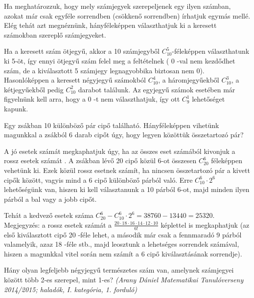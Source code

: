\begin{solution}
Ha meghatározzuk, hogy mely számjegyek szerepeljenek egy ilyen számban,
azokat már csak egyféle sorrendben (csökkenő sorrendben) írhatjuk
egymás mellé. Elég tehát azt megnéznünk, hányféleképpen választhatjuk
ki a keresett számokban szereplő számjegyeket.

Ha a keresett szám ötjegyű, akkor a 10 számjegyből $C_{10}^{5}$-féleképpen
választhatunk ki 5-öt, így ennyi ötjegyű szám felel meg a feltételnek
( 0 -val nem kezdődhet szám, de a kiválasztott 5 számjegy legnagyobbika
biztosan nem 0). Hasonlóképpen a keresett négyjegyű számokból $C_{10}^{4}$,
a háromjegyűekből $C_{10}^{3}$, a kétjegyűekből pedig $C_{10}^{2}$
darabot találunk. Az egyjegyű számok esetében már figyelnünk kell
arra, hogy a 0 -t nem választhatjuk, így ott $C_{9}^{1}$ lehetőséget
kapunk.
\end{solution}
\begin{extraproblem}
Egy zsákban 10 különböző pár cipő található. Hányféleképpen vihetünk
magunkkal a zsákból 6 darab cipőt úgy, hogy legyen közöttük összetartozó
pár? 
\end{extraproblem}

\begin{solution}
A jó esetek számát megkaphatjuk úgy, ha az összes eset számából kivonjuk
a rossz esetek számát . A zsákban lévő 20 cipő közül 6-ot összesen
$C_{20}^{6}$ féleképpen vehetünk ki. Ezek közül rossz esetnek számít,
ha nincsen összetartozó pár a kivett cipők között, vagyis mind a 6
cipő különböző párból való. Erre $C_{10}^{6}\cdot2^{6}$ lehetőségünk
van, hiszen ki kell választanunk a 10 párból 6-ot, majd minden ilyen
párból a bal vagy a jobb cipőt.

Tehát a kedvező esetek száma $C_{20}^{6}-C_{10}^{6}\cdot2^{6}=38760-13440=25320$.\\
 Megjegyzés: a rossz esetek számát a $\frac{20\cdot18\cdot16\cdot14\cdot12\cdot10}{6!}$
képlettel is megkaphatjuk (az első kiválasztott cipő 20 -féle lehet,
a második már csak a fennmaradó 9 párból valamelyik, azaz 18 -féle
stb., majd leosztunk a lehetséges sorrendek számával, hiszen a magunkkal
vitel során nem számít a 6 cipő kiválasztásának sorrendje).
\end{solution}
\begin{extraproblem}
Hány olyan legfeljebb négyjegyű természetes szám van, amelynek számjegyei
között több 2-es szerepel, mint 1-es? \emph{(Arany Dániel Matematikai
Tanulóverseny 2014/2015; haladók, I. kategória, 1. forduló) }
\end{extraproblem}

